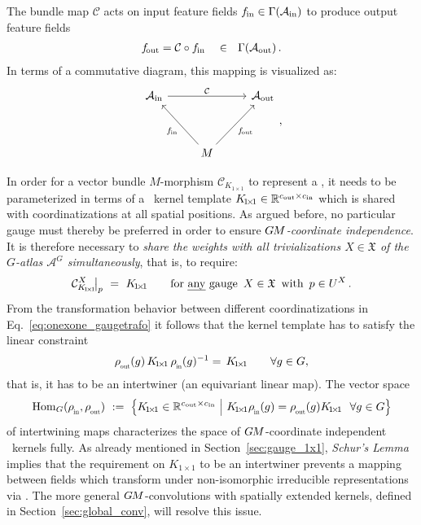 The bundle map $\mathcal{C}$ acts on input feature fields $f_\textup{\;\!\!in} \in \Gamma(\mathcal{A}_\textup{in})$ to produce output feature fields
\begin{align}
    f_\textup{\:\!\!out} = \mathcal{C} \circ f_\textup{\;\!\!in}
    \quad \in\ \ \Gamma(\mathcal{A}_\textup{out}) \,.
\end{align}
In terms of a commutative diagram, this mapping is visualized as:
\begin{equation}\label{eq:bundle_morphism_onexone_section}
    \begin{tikzcd}[row sep=3.5em, column sep=2.5em]
        \Ain
            \arrow[rr, "\mathcal{C}"]
        & &
        \Aout
        \\
        & M \arrow[ul, "\fin"]
            \arrow[ur, "\fout"']
    \end{tikzcd} ,
\end{equation}


In order for a vector bundle $M$-morphism $\mathcal{C}_{K_{\!1\!\times\!1}}$ to represent a \onexoneGM, it needs to be parameterized in terms of a \onexoneGM\ kernel template $K_{\!1\!\times\!1} \in \mathbb{R}^{{c_\textup{out}}\times{c_\textup{in}}}$ which is shared with coordinatizations at all spatial positions.
As argued before, no particular gauge must thereby be preferred in order to ensure \emph{$G\mkern-1.4muM$-coordinate independence}.
It is therefore necessary to \emph{share the weights with all trivializations $X \in \mathfrak{X}$ of the $G$-atlas $\mathscr{A}^G$ simultaneously}, that is, to require:
\begin{align}\label{eq:weight_sharing_onexone}
    \mathcal{C}_{K_{\!1\!\times\!1}}^X\!\big|_p\ =\ K_{\!1\!\times\!1}
    \qquad \textup{for \emph{any} gauge}\,\ X \in \mathfrak{X}\,\ \textup{with}\,\ p\in U^X \,.
\end{align}
From the transformation behavior between different coordinatizations in Eq.~\eqref{eq:onexone_gaugetrafo} it follows that the kernel template has to satisfy the linear constraint
\begin{align}\label{eq:onexone_kernel_constraint}
    \rhoout(g)\, K_{\!1\!\times\!1}\, \rhoin(g)^{-1}  =\, K_{\!1\!\times\!1} \qquad\forall g\in G,
\end{align}
that is, it has to be an intertwiner (an equivariant linear map).
The vector space
\begin{align}
    \Hom_G(\rhoin,\rhoout)\ :=\ 
    \pig\{ K_{\!1\!\times\!1} \in \R^{\cout\times\cin}\ \pig|\ 
    K_{\!1\!\times\!1} \rhoin(g) = \rhoout(g) K_{\!1\!\times\!1}\ \ \forall g\in G \pig\}
\end{align}
of intertwining maps characterizes the space of $G\mkern-1.4muM$-coordinate independent \onexone\ kernels fully.
As already mentioned in Section~\ref{sec:gauge_1x1}, \emph{Schur's Lemma}~\cite{gallier2019harmonicRepr} implies that the requirement on $K_{\!1\!\times\!1}$ to be an intertwiner prevents a mapping between fields which transform under non-isomorphic irreducible representations via \onexoneGMs.
The more general $G\mkern-1.4muM$-convolutions with spatially extended kernels, defined in Section~\ref{sec:global_conv}, will resolve this issue.


